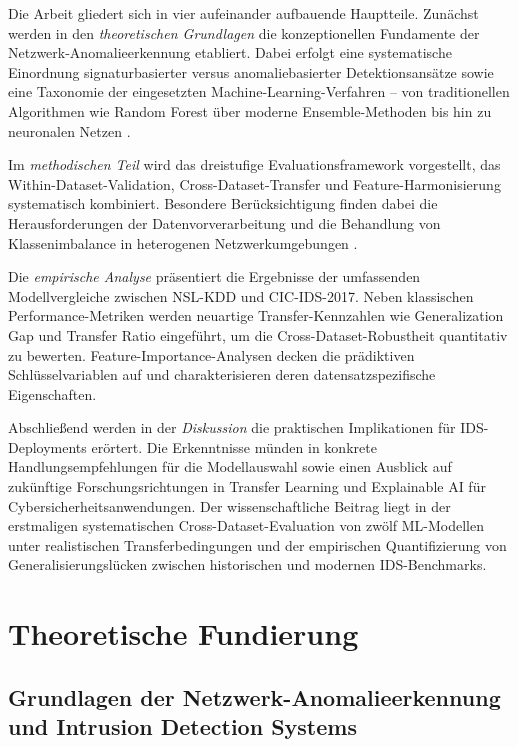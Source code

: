 \documentclass[11pt,a4paper]{article}
\begin{document}
    Die Arbeit gliedert sich in vier aufeinander aufbauende Hauptteile. Zunächst werden in den \textit{theoretischen Grundlagen} die konzeptionellen Fundamente der Netzwerk-Anomalieerkennung etabliert. Dabei erfolgt eine systematische Einordnung signaturbasierter versus anomaliebasierter Detektionsansätze sowie eine Taxonomie der eingesetzten Machine-Learning-Verfahren – von traditionellen Algorithmen wie Random Forest über moderne Ensemble-Methoden bis hin zu neuronalen Netzen \parencite{McHugh2000,Vinayakumar2019}.

    Im \textit{methodischen Teil} wird das dreistufige Evaluationsframework vorgestellt, das Within-Dataset-Validation, Cross-Dataset-Transfer und Feature-Harmonisierung systematisch kombiniert. Besondere Berücksichtigung finden dabei die Herausforderungen der Datenvorverarbeitung und die Behandlung von Klassenimbalance in heterogenen Netzwerkumgebungen \parencite{Gharib2016}.

    Die \textit{empirische Analyse} präsentiert die Ergebnisse der umfassenden Modellvergleiche zwischen NSL-KDD und CIC-IDS-2017. Neben klassischen Performance-Metriken werden neuartige Transfer-Kennzahlen wie Generalization Gap und Transfer Ratio eingeführt, um die Cross-Dataset-Robustheit quantitativ zu bewerten. Feature-Importance-Analysen decken die prädiktiven Schlüsselvariablen auf und charakterisieren deren datensatzspezifische Eigenschaften.

    Abschließend werden in der \textit{Diskussion} die praktischen Implikationen für IDS-Deployments erörtert. Die Erkenntnisse münden in konkrete Handlungsempfehlungen für die Modellauswahl sowie einen Ausblick auf zukünftige Forschungsrichtungen in Transfer Learning und Explainable AI für Cybersicherheitsanwendungen. Der wissenschaftliche Beitrag liegt in der erstmaligen systematischen Cross-Dataset-Evaluation von zwölf ML-Modellen unter realistischen Transferbedingungen und der empirischen Quantifizierung von Generalisierungslücken zwischen historischen und modernen IDS-Benchmarks.


    \section{Theoretische Fundierung}

    \subsection{Grundlagen der Netzwerk-Anomalieerkennung und Intrusion Detection Systems}
\end{document}
